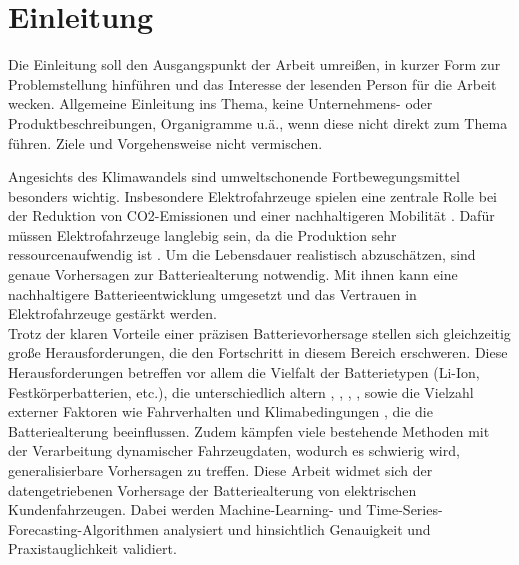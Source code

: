 
\chapter{Einleitung}
Die Einleitung soll den Ausgangspunkt der Arbeit umreißen, in kurzer Form zur Problemstellung hinführen und das Interesse der lesenden Person für die Arbeit wecken. Allgemeine Einleitung ins Thema, keine Unternehmens- oder Produktbeschreibungen, Organigramme u.ä., wenn diese nicht direkt zum Thema führen. Ziele und Vorgehensweise nicht vermischen.

Angesichts des Klimawandels sind umweltschonende Fortbewegungsmittel besonders wichtig. Insbesondere Elektrofahrzeuge spielen eine zentrale Rolle bei der Reduktion von CO2-Emissionen und einer nachhaltigeren Mobilität \cite{urlIdParisKlimaabkommen}. Dafür müssen Elektrofahrzeuge langlebig sein, da die Produktion sehr ressourcenaufwendig ist \cite{urlIdUmwelteinflussLithiumBatterien}. Um die Lebensdauer realistisch abzuschätzen, sind genaue Vorhersagen zur Batteriealterung notwendig. Mit ihnen kann eine nachhaltigere Batterieentwicklung umgesetzt und das Vertrauen in Elektrofahrzeuge gestärkt werden.\\
Trotz der klaren Vorteile einer präzisen Batterievorhersage stellen sich gleichzeitig große Herausforderungen, die den Fortschritt in diesem Bereich erschweren. Diese Herausforderungen betreffen vor allem die Vielfalt der Batterietypen (Li-Ion, Festkörperbatterien, etc.), die unterschiedlich altern \cite{urlIdBatterieAlterungLithiumBatterien}, \cite{urlIdBatterieAlterungVerschiedenerSoCLithiumBatterien}, \cite{urlIdBatterieAlterungFestkörperBatterien}, \cite{urlIdBatterieAlterungVerschiedenerLithiumBatterien}, sowie die Vielzahl externer Faktoren wie Fahrverhalten und Klimabedingungen \cite{urlIdBatterieAlterungTemperatur}, die die Batteriealterung beeinflussen. Zudem kämpfen viele bestehende Methoden mit der Verarbeitung dynamischer Fahrzeugdaten, wodurch es schwierig wird, generalisierbare Vorhersagen zu treffen. Diese Arbeit widmet sich der datengetriebenen Vorhersage der Batteriealterung von elektrischen Kundenfahrzeugen. Dabei werden Machine-Learning- und Time-Series-Forecasting-Algorithmen analysiert und hinsichtlich Genauigkeit und Praxistauglichkeit validiert.
\pagebreak
